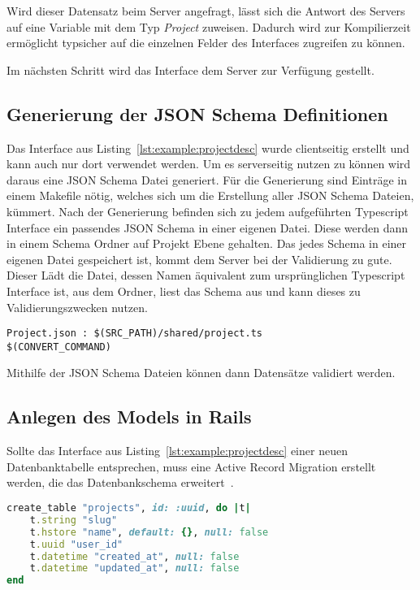 Wird dieser Datensatz beim Server angefragt, lässt sich die Antwort des Servers auf eine Variable mit dem Typ \emph{Project} zuweisen.
Dadurch wird zur Kompilierzeit ermöglicht typsicher auf die einzelnen Felder des Interfaces zugreifen zu können.

Im nächsten Schritt wird das Interface dem Server zur Verfügung gestellt.

\subsection{Generierung der JSON Schema Definitionen}
\label{sec:requirements:example:schema}
Das Interface aus Listing~\ref{lst:example:projectdesc} wurde clientseitig erstellt und kann auch nur dort verwendet werden. Um es serverseitig nutzen zu können wird daraus eine JSON Schema Datei generiert.
Für die Generierung sind Einträge in einem Makefile nötig, welches sich um die Erstellung aller JSON Schema Dateien, kümmert. Nach der Generierung befinden sich zu jedem aufgeführten Typescript Interface ein passendes JSON Schema in einer eigenen Datei. Diese werden dann in einem Schema Ordner auf Projekt Ebene gehalten. Das jedes Schema in einer eigenen Datei gespeichert ist, kommt dem Server bei der Validierung zu gute. 
Dieser Lädt die Datei, dessen Namen äquivalent zum ursprünglichen Typescript Interface ist, aus dem Ordner, liest das Schema aus und kann dieses zu Validierungszwecken nutzen.

\begin{lstlisting}[float=h!,caption={TypeScript Interface für die Project Darstellung in einer Liste}, label={lst:example:makefile}]
Project.json : $(SRC_PATH)/shared/project.ts
$(CONVERT_COMMAND)
\end{lstlisting}

Mithilfe der JSON Schema Dateien können dann Datensätze validiert werden.

\subsection{Anlegen des Models in Rails}
\label{sec:requirements:example:model}

Sollte das Interface aus Listing~\ref{lst:example:projectdesc} einer neuen Datenbanktabelle entsprechen, muss eine Active Record Migration erstellt werden,
die das Datenbankschema erweitert~\cite{rails-migration}.

\begin{lstlisting}[language=Ruby,float=h!,caption={Rails Migration zum hinzufügen einer \emph{projects} Datenbanktabelle}, label={lst:example:migration}]
create_table "projects", id: :uuid, do |t|
	t.string "slug"
	t.hstore "name", default: {}, null: false
	t.uuid "user_id"
	t.datetime "created_at", null: false
	t.datetime "updated_at", null: false
end
\end{lstlisting}

